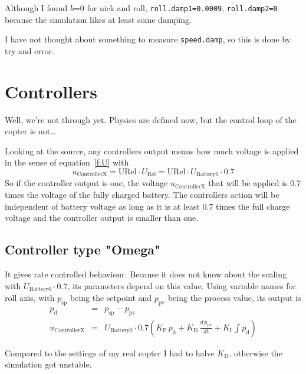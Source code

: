 \documentclass[a4paper, 11pt, pdftex]{article}
\newcommand{\vi}[1]{_{\textrm{#1}}}
\begin{document}
    Although I found $b$=0 for nick and roll, {\tt roll.damp1=0.0009}, {\tt roll.damp2=0}
    because the simulation likes at least some damping.        
    
    I have not thought about something to measure {\tt speed.damp}, so this
    is done by try and error.

  \section{Controllers}
  
    Well, we're not through yet. Physics are defined now, but the control
    loop of the copter is not\dots
    
    Looking at the source, any controllers output means how much voltage is
    applied in the sense of equation~\eqref{f:U} with 
    \begin{equation}
      u\vi{ControllerX} = \textrm{URel} \cdot U\vi{Rel} = \textrm{URel} \cdot U\vi{Battery0} \cdot 0.7
    \end{equation}
    So if the controller output is one, the voltage $u\vi{ControllerX}$ that
    will be applied is 0.7 times the voltage of the fully charged battery.
    The controllers action will be independent of battery voltage as
    long as it is at least 0.7 times the full charge voltage and the
    controller output is smaller than one.

    \subsection{Controller type "Omega"}

    It gives rate controlled behaviour. Because it does not know about the
    scaling with $U\vi{Battery0} \cdot 0.7$, its parameters depend on this
    value. Using variable names for roll axis, with $p\vi{sp}$ being the
    setpoint and $p\vi{pv}$ being the process value, its output is
    \begin{subequations}
    \begin{eqnarray}
      p\vi{d}           &=& p\vi{sp} - p\vi{pv}\\
      u\vi{ControllerX} &=& U\vi{Battery0} \cdot 0.7 \left( K\vi{P} \, p\vi{d} + K\vi{D} \, \frac{d\,p\vi{pv}}{dt} + K\vi{I} \, \int p\vi{d} \right)
    \end{eqnarray}
    \end{subequations}
    
    Compared to the settings of my real copter I had to halve $K\vi{D}$,
    otherwise the simulation got unstable.
    
\end{document}

